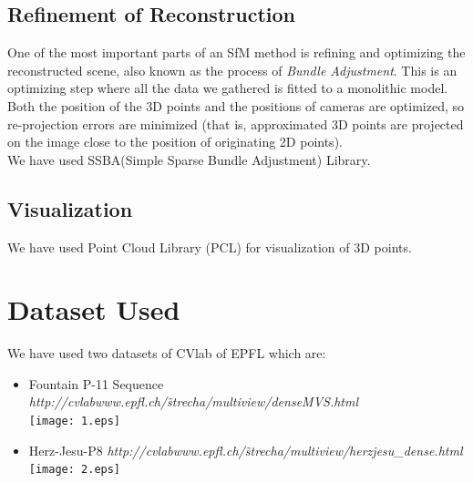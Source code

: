 \documentclass{article}
\begin{document}
\subsection{Refinement of Reconstruction}
One of the most important parts of an SfM method is refining and optimizing the reconstructed scene, also known as the process of \emph{Bundle Adjustment}. This is an optimizing step where all the data we gathered is fitted to a monolithic model. Both the position of the 3D points and the positions of cameras are optimized, so re-projection errors are minimized (that is, approximated 3D points are projected on the image close to the position of originating 2D points).\\
We have used SSBA(Simple Sparse Bundle Adjustment) Library.

\subsection{Visualization}
We have used Point Cloud Library (PCL) for visualization of 3D points.

\section{Dataset Used}
We have used two datasets of CVlab of EPFL which are:
\begin{itemize}
\item Fountain P-11 Sequence \emph{http://cvlabwww.epfl.ch/\~strecha/multiview/denseMVS.html}\\
\texttt{[image: 1.eps]}
\item Herz-Jesu-P8 \emph{http://cvlabwww.epfl.ch/\~strecha/multiview/herzjesu\_dense.html}\\
\texttt{[image: 2.eps]}
\end{itemize}
\end{document}

